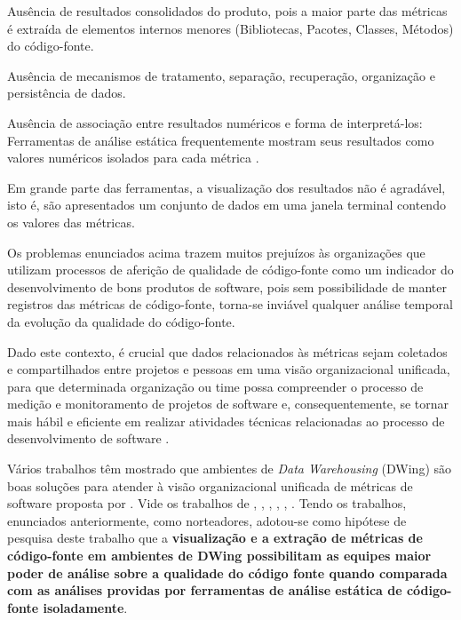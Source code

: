 
\begin{problems}
    \item Ausência de resultados consolidados do produto, pois a maior 
	parte das métricas é extraída de elementos internos menores (Bibliotecas, 
	Pacotes, Classes, Métodos) do código-fonte.
    
	\item Ausência de mecanismos de tratamento, separação, recuperação, 
	organização e persistência de dados. 
	
	\item Ausência de associação entre resultados numéricos e forma de 
	interpretá-los: Ferramentas de análise estática frequentemente mostram 
	seus resultados como valores numéricos isolados para cada métrica 
	\cite{Meirelles2013}. 
	
	\item Em grande parte das ferramentas, a visualização dos resultados não é 
	agradável, isto é, são apresentados um conjunto de dados em uma janela 
	terminal contendo os valores das métricas.
	
    \end{problems}
	
Os problemas enunciados acima trazem muitos prejuízos às organizações que 
utilizam processos de aferição de qualidade de código-fonte como um indicador do desenvolvimento de bons produtos de software, pois sem possibilidade de manter registros das métricas de código-fonte, torna-se inviável qualquer análise temporal da evolução da qualidade do código-fonte. 

Dado este contexto, é crucial que dados relacionados às métricas sejam 
coletados e compartilhados entre projetos e pessoas em uma visão organizacional unificada, para que determinada organização ou time possa compreender o processo de medição e monitoramento de projetos de software e, 
consequentemente, se tornar mais hábil e eficiente em realizar atividades 
técnicas relacionadas ao processo de desenvolvimento de software 
\cite{Chulani2003}. 



Vários trabalhos têm mostrado que ambientes de \textit{Data Warehousing} 
(DWing) são boas soluções para atender à visão organizacional unificada de 
métricas de software proposta por . Vide os trabalhos 
de , , ,
, , . 
Tendo os trabalhos, enunciados anteriormente, como norteadores, adotou-se como 
hipótese de pesquisa deste trabalho que a \textbf{visualização e a extração 
de métricas de código-fonte em ambientes de DWing possibilitam as equipes maior poder de análise sobre a qualidade do código fonte quando comparada com as análises providas por ferramentas de análise estática de código-fonte isoladamente}. 


